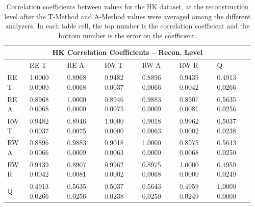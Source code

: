\begin{table}
\setlength\tabcolsep{15pt}
\small
\centering
\renewcommand{\arraystretch}{1.4}
\begin{tabularx}{0.8\linewidth}{@{\extracolsep{\fill}}lXXXXXX}
  \toprule
  	\multicolumn{7}{c}{{\normalsize HK Correlation Coefficients -- Recon. Level}} \\
  \midrule
  	       & RE T & RE A & RW T & RW A & RW R & \quad Q \\
  \midrule
	RE T   & 1.0000 0.0000 & 0.8968 0.0068 & 0.9482 0.0037 & 0.8896 0.0066 & 0.9439 0.0042 & 0.4913 0.0266  \\
	RE A   & 0.8968 0.0068 & 1.0000 0.0000 & 0.8946 0.0075 & 0.9883 0.0009 & 0.8907 0.0081 & 0.5635 0.0256  \\
	RW T   & 0.9482 0.0037 & 0.8946 0.0075 & 1.0000 0.0000 & 0.9018 0.0063 & 0.9962 0.0002 & 0.5037 0.0238  \\
	RW A   & 0.8896 0.0066 & 0.9883 0.0009 & 0.9018 0.0063 & 1.0000 0.0000 & 0.8975 0.0068 & 0.5643 0.0250  \\
	RW R   & 0.9439 0.0042 & 0.8907 0.0081 & 0.9962 0.0002 & 0.8975 0.0068 & 1.0000 0.0000 & 0.4959 0.0249  \\
	Q      & 0.4913 0.0266 & 0.5635 0.0256 & 0.5037 0.0238 & 0.5643 0.0250 & 0.4959 0.0249 & 1.0000 0.0000  \\
  \bottomrule
\end{tabularx}
\caption[]{Correlation coefficients between \R values for the HK dataset, at the reconstruction level after the \RW T-Method and A-Method \R values were averaged among the different analyzers. In each table cell, the top number is the correlation coefficient and the bottom number is the error on the coefficient.}
\label{tab:Corrs_HK_recon}
\end{table}


